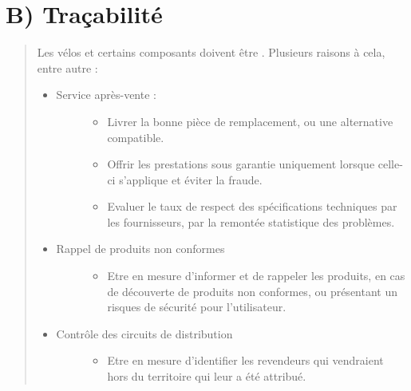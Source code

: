 \documentclass[letterpaper,10pt,french]{sphinxmanual}
\begin{document}
\section{B) Traçabilité}
\label{\detokenize{readthedocs/study:b-tracabilite}}\begin{quote}

Les vélos et certains composants doivent être . Plusieurs raisons à cela, entre autre :
\begin{itemize}
\item {} \begin{description}
\item[{Service après-vente :}] \leavevmode\begin{itemize}
\item {} 
Livrer la bonne pièce de remplacement, ou une alternative compatible.

\item {} 
Offrir les prestations sous garantie uniquement lorsque celle-ci s’applique et éviter la fraude.

\item {} 
Evaluer le taux de respect des spécifications techniques par les fournisseurs, par la remontée statistique des problèmes.

\end{itemize}

\end{description}

\item {} \begin{description}
\item[{Rappel de produits non conformes}] \leavevmode\begin{itemize}
\item {} 
Etre en mesure d’informer et de rappeler les produits, en cas de découverte de produits non conformes, ou présentant un risques de sécurité pour l’utilisateur.

\end{itemize}

\end{description}

\item {} \begin{description}
\item[{Contrôle des circuits de distribution}] \leavevmode\begin{itemize}
\item {} 
Etre en mesure d’identifier les revendeurs qui vendraient hors du territoire qui leur a été attribué.


\end{itemize}
\end{description}
\end{itemize}
\end{quote}
\end{document}
